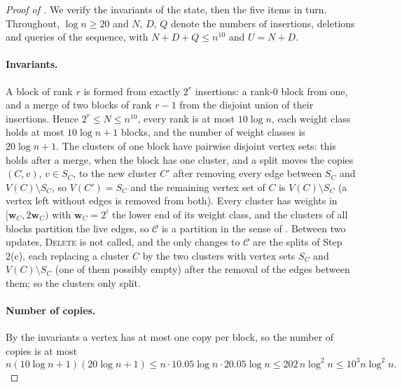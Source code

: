\documentclass[11pt]{article}
\theoremstyle{remark}
\newcommand{\ww}{\mathbf w}
\newcommand{\Ccal}{\mathcal{C}}
\begin{document}
\begin{proof}[Proof of ]
We verify the invariants of the state, then the five items in turn.
Throughout, $\log n \ge 20$ and $N$, $D$, $Q$ denote the numbers of
insertions, deletions and queries of the sequence, with
$N + D + Q \le n^{10}$ and $U = N + D$.

\paragraph{Invariants.}
A block of rank $r$ is formed from exactly $2^{r}$ insertions: a rank-$0$
block from one, and a merge of two blocks of rank $r - 1$ from the
disjoint union of their insertions.
Hence $2^{r} \le N \le n^{10}$, every rank is at most $10 \log n$, each
weight class holds at most $10 \log n + 1$ blocks, and the number of weight
classes is $20 \log n + 1$.
The clusters of one block have pairwise disjoint vertex sets: this holds
after a merge, when the block has one cluster, and a split moves the copies
$(C, v)$, $v \in S_C$, to the new cluster $C'$ after removing every edge
between $S_C$ and $V(C) \setminus S_C$, so $V(C') = S_C$ and the remaining
vertex set of $C$ is $V(C) \setminus S_C$ (a vertex left without edges is
removed from both).
Every cluster has weights in $[\ww_C, 2\ww_C)$ with $\ww_C = 2^{i}$ the lower
end of its weight class, and the clusters of all blocks partition the live
edges, so $\Ccal$ is a partition in the sense of .
Between two updates, \textsc{Delete} is not called, and the only changes
to $\Ccal$ are the splits of Step 2(c), each replacing a cluster $C$ by the
two clusters with vertex sets $S_C$ and $V(C) \setminus S_C$ (one of them
possibly empty) after the removal of the edges between them; so the
clusters only split.

\paragraph{Number of copies.}
By the invariants a vertex has at most one copy per block, so the number of
copies is at most
\[
n \left( 10 \log n + 1 \right) \left( 20 \log n + 1 \right)
\le n \cdot 10.05 \log n \cdot 20.05 \log n
\le 202 \, n \log^{2} n
\le 10^{3} n \log^{2} n .
\]


\end{proof}
\end{document}
